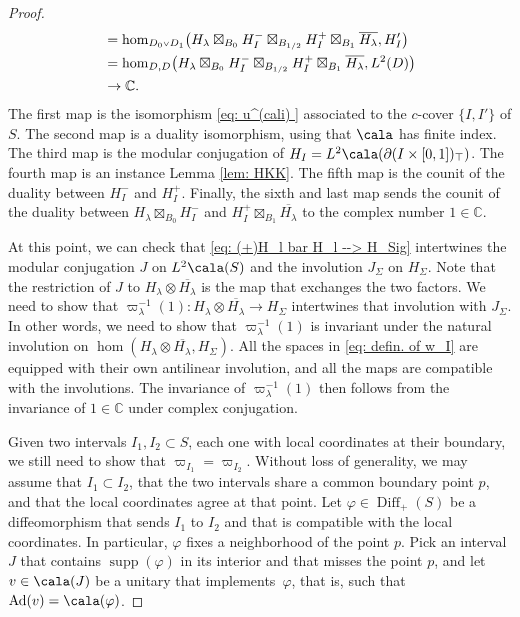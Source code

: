\documentclass[a4paper,10pt,leqno]{amsart}
\newcommand{\IC}{\mathbb{C}}     \newcommand{\calc}{\mathcal{C}}
\theoremstyle{plain}
\theoremstyle{definition}
\theoremstyle{remark}
\DeclareMathOperator{\ad}{Ad}
\DeclareMathOperator{\Diff}{Diff}
\DeclareMathOperator{\supp}{supp}
\begin{document}
\begin{proof}
\begin{equation}
\begin{split}
&=\hom_{D_0{\scriptscriptstyle\vee}D_1}\!\big(H_\lambda\boxtimes_{B_0} H_I^-\boxtimes_{B_{1/2}} H_I^+\boxtimes_{B_1} \overline{H_\lambda},H'_I\big)\\\hspace{-1.2cm}
&=\hom_{D,D}\!\big(H_\lambda\boxtimes_{B_0} H_I^-\boxtimes_{B_{1/2}} H_I^+\boxtimes_{B_1} \overline{H_\lambda},L^2(D)\big)\\\hspace{-1.2cm}
&\to\IC.
\end{split}
\end{equation}
The first map is the isomorphism \eqref{eq:  u^(cali) } associated to the $c$-cover $\{I,I'\}$ of $S$.
The second map is a duality isomorphism, using that $\cala$ has finite index.
The third map is the modular conjugation of $H_I=L^2\cala(\partial(I\times [0,1])_\top)$.
The fourth map is an instance Lemma \ref{lem: HKK}.
The fifth map is the counit of the duality between $H_I^-$ and $H_I^+$. 
Finally, the sixth and last map sends the counit of the duality between $H_\lambda\boxtimes_{B_0} H_I^-$ and $H_I^+\boxtimes_{B_1} \overline{H_\lambda}$
to the complex number $1\in \IC$.

At this point, we can check that \eqref{eq: (+)H_l bar H_l --> H_Sig} intertwines the modular conjugation $J$ on $L^2\cala(S)$ and the involution $J_\Sigma$ on $H_\Sigma$.
Note that the restriction of $J$ to $H_\lambda\otimes\overline{H_\lambda}$ is the map that exchanges the two factors.
We need to show that $\varpi_{\lambda}^{-1}(1):H_\lambda\otimes\overline{H_\lambda}\to H_\Sigma$ intertwines that involution with $J_\Sigma$.
In other words, we need to show that $\varpi_\lambda^{-1}(1)$ is invariant under the natural involution on $\hom(H_\lambda\otimes \overline{H_\lambda},H_\Sigma)$.
All the spaces in \eqref{eq: defin. of w_I} are equipped with their own antilinear involution, and all the maps are compatible with the involutions.
The invariance of $\varpi_\lambda^{-1}(1)$ then follows from the invariance of $1\in \mathbb C$ under complex conjugation.

Given two intervals $I_1,I_2\subset S$, each one with local coordinates at their boundary, we still need to show that $\varpi_{I_1}=\varpi_{I_2}$.
Without loss of generality, we may assume that $I_1\subset I_2$, that the two intervals share a common boundary point $p$, and that the local coordinates agree at that point.
Let $\varphi\in\Diff_+(S)$ be a diffeomorphism that sends $I_1$ to $I_2$ and that is compatible with the local coordinates.
In particular, $\varphi$ fixes a neighborhood of the point $p$.
Pick an interval $J$ that contains $\supp(\varphi)$ in its interior and that misses the point $p$,
and let $v\in\cala(J)$ be a unitary that implements~$\varphi$, that is, such that $\ad(v)=\cala(\varphi)$.


\end{proof}
\end{document}
